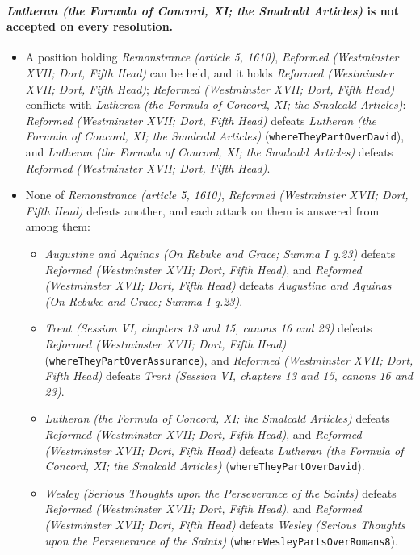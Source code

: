 \documentclass[11pt]{article}
\begin{document}
\paragraph{\emph{Lutheran (the Formula of Concord, XI; the Smalcald Articles)} is not accepted on every resolution.}
\begin{itemize}
\item A position holding \emph{Remonstrance (article 5, 1610)}, \emph{Reformed (Westminster XVII; Dort, Fifth Head)} can be held, and it holds \emph{Reformed (Westminster XVII; Dort, Fifth Head)}; \emph{Reformed (Westminster XVII; Dort, Fifth Head)} conflicts with \emph{Lutheran (the Formula of Concord, XI; the Smalcald Articles)}: \emph{Reformed (Westminster XVII; Dort, Fifth Head)} defeats \emph{Lutheran (the Formula of Concord, XI; the Smalcald Articles)} (\texttt{where\allowbreak{}They\allowbreak{}Part\allowbreak{}Over\allowbreak{}David}), and \emph{Lutheran (the Formula of Concord, XI; the Smalcald Articles)} defeats \emph{Reformed (Westminster XVII; Dort, Fifth Head)}.
\item None of \emph{Remonstrance (article 5, 1610)}, \emph{Reformed (Westminster XVII; Dort, Fifth Head)} defeats another, and each attack on them is answered from among them:
\begin{itemize}
\item \emph{Augustine and Aquinas (On Rebuke and Grace; Summa I q.23)} defeats \emph{Reformed (Westminster XVII; Dort, Fifth Head)}, and \emph{Reformed (Westminster XVII; Dort, Fifth Head)} defeats \emph{Augustine and Aquinas (On Rebuke and Grace; Summa I q.23)}.
\item \emph{Trent (Session VI, chapters 13 and 15, canons 16 and 23)} defeats \emph{Reformed (Westminster XVII; Dort, Fifth Head)} (\texttt{where\allowbreak{}They\allowbreak{}Part\allowbreak{}Over\allowbreak{}Assurance}), and \emph{Reformed (Westminster XVII; Dort, Fifth Head)} defeats \emph{Trent (Session VI, chapters 13 and 15, canons 16 and 23)}.
\item \emph{Lutheran (the Formula of Concord, XI; the Smalcald Articles)} defeats \emph{Reformed (Westminster XVII; Dort, Fifth Head)}, and \emph{Reformed (Westminster XVII; Dort, Fifth Head)} defeats \emph{Lutheran (the Formula of Concord, XI; the Smalcald Articles)} (\texttt{where\allowbreak{}They\allowbreak{}Part\allowbreak{}Over\allowbreak{}David}).
\item \emph{Wesley (Serious Thoughts upon the Perseverance of the Saints)} defeats \emph{Reformed (Westminster XVII; Dort, Fifth Head)}, and \emph{Reformed (Westminster XVII; Dort, Fifth Head)} defeats \emph{Wesley (Serious Thoughts upon the Perseverance of the Saints)} (\texttt{where\allowbreak{}Wesley\allowbreak{}Parts\allowbreak{}Over\allowbreak{}Romans8}).
\end{itemize}
\end{itemize}
\end{document}
